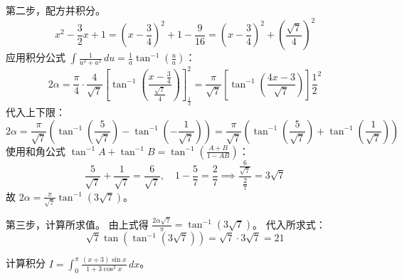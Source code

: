 \begin{questions}
\begin{solution}
第二步，配方并积分。
\[
x^2 - \frac{3}{2}x + 1 = \left(x - \frac{3}{4}\right)^2 + 1 - \frac{9}{16} = \left(x - \frac{3}{4}\right)^2 + \left(\frac{\sqrt{7}}{4}\right)^2
\]
应用积分公式 $\int \frac{1}{u^2 + a^2} \,du = \frac{1}{a} \tan^{-1}(\frac{u}{a})$：
\[
2\alpha = \frac{\pi}{4} \cdot \frac{4}{\sqrt{7}} \left[ \tan^{-1}\left( \frac{x - \frac{3}{4}}{\frac{\sqrt{7}}{4}} \right) \right]_{\frac{1}{2}}^{2} = \frac{\pi}{\sqrt{7}} \left[ \tan^{-1}\left( \frac{4x - 3}{\sqrt{7}} \right) \right]{\frac{1}{2}}^{2}
\]
代入上下限：
\[
2\alpha = \frac{\pi}{\sqrt{7}} \left( \tan^{-1}\left(\frac{5}{\sqrt{7}}\right) - \tan^{-1}\left(-\frac{1}{\sqrt{7}}\right) \right) = \frac{\pi}{\sqrt{7}} \left( \tan^{-1}\left(\frac{5}{\sqrt{7}}\right) + \tan^{-1}\left(\frac{1}{\sqrt{7}}\right) \right)
\]
使用和角公式 $\tan^{-1} A + \tan^{-1} B = \tan^{-1}\left(\frac{A+B}{1-AB}\right)$：
\[
\frac{5}{\sqrt{7}} + \frac{1}{\sqrt{7}} = \frac{6}{\sqrt{7}}, \quad 1 - \frac{5}{7} = \frac{2}{7} \implies \frac{\frac{6}{\sqrt{7}}}{\frac{2}{7}} = 3\sqrt{7}
\]
故 $2\alpha = \frac{\pi}{\sqrt{7}} \tan^{-1}(3\sqrt{7})$。

第三步，计算所求值。
由上式得 $\frac{2\alpha\sqrt{7}}{\pi} = \tan^{-1}(3\sqrt{7})$。
代入所求式：
\[
\sqrt{7} \tan\left( \tan^{-1}(3\sqrt{7}) \right) = \sqrt{7} \cdot 3\sqrt{7} = 21
\]
\end{solution}

\question
计算积分 $I = \int_{0}^{\pi} \frac{(x+3) \sin x}{1+3 \cos^2 x} \,dx$。


\end{questions}
